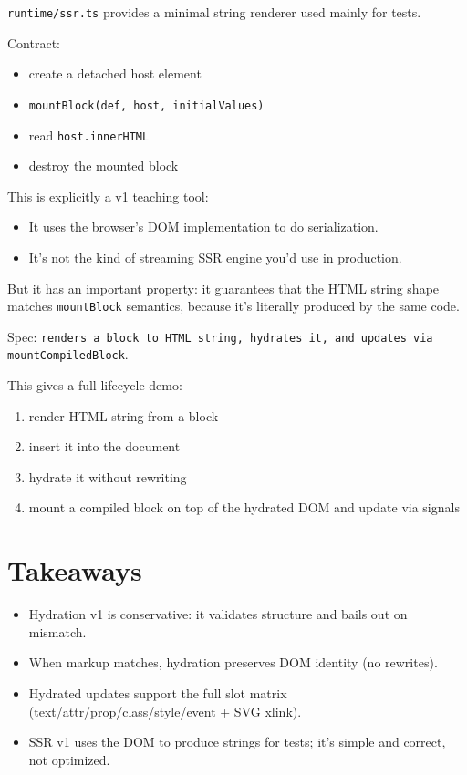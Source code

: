 \texttt{runtime/ssr.ts} provides a minimal string renderer used mainly for tests.

Contract:

\begin{itemize}
  \item create a detached host element
  \item \texttt{mountBlock(def, host, initialValues)}
  \item read \texttt{host.innerHTML}
  \item destroy the mounted block
\end{itemize}

This is explicitly a v1 teaching tool:

\begin{itemize}
  \item It uses the browser’s DOM implementation to do serialization.
  \item It’s not the kind of streaming SSR engine you’d use in production.
\end{itemize}

But it has an important property: it guarantees that the HTML string shape matches \texttt{mountBlock} semantics, because it’s literally produced by the same code.

Spec: \texttt{renders a block to HTML string, hydrates it, and updates via mountCompiledBlock}.

This gives a full lifecycle demo:

\begin{enumerate}
  \item render HTML string from a block
  \item insert it into the document
  \item hydrate it without rewriting
  \item mount a compiled block on top of the hydrated DOM and update via signals
\end{enumerate}

\section{Takeaways}

\begin{itemize}
  \item Hydration v1 is conservative: it validates structure and bails out on mismatch.
  \item When markup matches, hydration preserves DOM identity (no rewrites).
  \item Hydrated updates support the full slot matrix (text/attr/prop/class/style/event + SVG xlink).
  \item SSR v1 uses the DOM to produce strings for tests; it’s simple and correct, not optimized.
\end{itemize}

